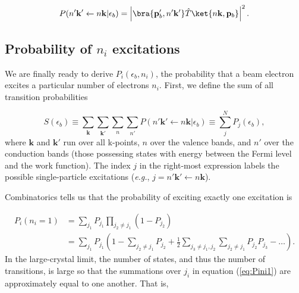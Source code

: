 \documentclass{article}
\begin{document}
\begin{equation}
  P(n'\mathbf{k'}\leftarrow n\mathbf{k}|\epsilon_b)
  =
  \left|
  \bra{\mathbf{p}_b', n'\mathbf{k'}} \hat{T} \ket{n\mathbf{k},\mathbf{p}_b}
  \right|^2.
  \label{eq:prob}
\end{equation}
%

\subsection{Probability of $n_i$ excitations}
\label{sec:Pi}

We are finally ready to derive $P_i(\epsilon_b, n_i)$, the probability that a
beam electron excites a particular number of electrons $n_i$.  First, we define
the sum of all transition probabilities

\begin{equation}
  S(\epsilon_b)
  \equiv
  \sum_\mathbf{k} \sum_\mathbf{k'} \sum_n \sum_{n'}
  P(n'\mathbf{k}'\leftarrow n\mathbf{k}|\epsilon_b)
  \equiv
  \sum_j^N P_j(\epsilon_b),
  \label{eq:S}
\end{equation}
%
where $\mathbf{k}$ and $\mathbf{k'}$ run over all k-points, $n$ over
the valence bands, and $n'$ over the conduction bands (those possessing states
with energy between the Fermi level and the work function).
The index $j$ in the right-most expression labels the possible single-particle
excitations (\textit{e.g.}, $j=n'\mathbf{k'}\leftarrow n\mathbf{k}$).

Combinatorics tells us that the probability of exciting exactly one excitation
is

\begin{equation}
  \begin{aligned}
    P_i(n_i=1)
    &=
    \sum_{j_1} P_{j_1}
    \prod_{j_2\neq j_1} (1 - P_{j_2})
    \\&=
    \sum_{j_1} P_{j_1}
    \left(
      1 - \sum_{j_2\neq j_1} P_{j_2}
      + \frac{1}{2} \sum_{j_3\neq j_1,j_2} \sum_{j_2\neq j_1} P_{j_2} P_{j_3}
      - \dots
    \right).
  \label{eq:Pini1}
  \end{aligned}
\end{equation}
%
In the large-crystal limit, the number of states, and thus the number of
transitions, is large so that the summations over $j_i$ in equation
(\ref{eq:Pini1}) are approximately equal to one another.
That is,
\end{document}
